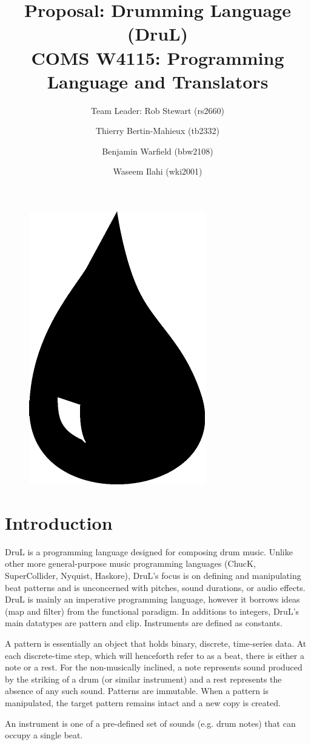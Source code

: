 \documentclass[11pt,twoside]{article}
\title{Proposal: Drumming Language \textbf{(DruL)}\\
\vspace{1cm}
COMS W4115: Programming Language and Translators}
\author{Team Leader: Rob Stewart (rs2660) \and Thierry Bertin-Mahieux (tb2332) \and Benjamin Warfield (bbw2108) \and Waseem Ilahi (wki2001)}
\begin{document}
\maketitle
\begin{center}
\end{center}

\vspace{3cm}

\begin{figure}[h]
\begin{center}
\includegraphics[width=.2\columnwidth]{Water_Drop.pdf}
\end{center}
\end{figure}

\newpage

\section{Introduction}
DruL is a programming language designed for composing drum music.  Unlike other more general-purpose music programming languages (ChucK, SuperCollider, Nyquist, Haskore), DruL's focus is on defining and manipulating beat patterns and is unconcerned with pitches, sound durations, or audio effects.  DruL is mainly an imperative programming language, however it borrows ideas (map and filter) from the functional paradigm.  In additions to integers, DruL's main datatypes are pattern and clip. Instruments are defined as constants.

A pattern is essentially an object that holds binary, discrete, time-series data.  At each discrete-time step, which will henceforth refer to as a beat, there is either a note or a rest.  For the non-musically inclined, a note represents sound produced by the striking of a drum (or similar instrument) and a rest represents the absence of any such sound.  Patterns are immutable.  When a pattern is manipulated, the target pattern remains intact and a new copy is created.

An instrument is one of a pre-defined set of sounds (e.g. drum notes) that can occupy a single beat.
\end{document}
